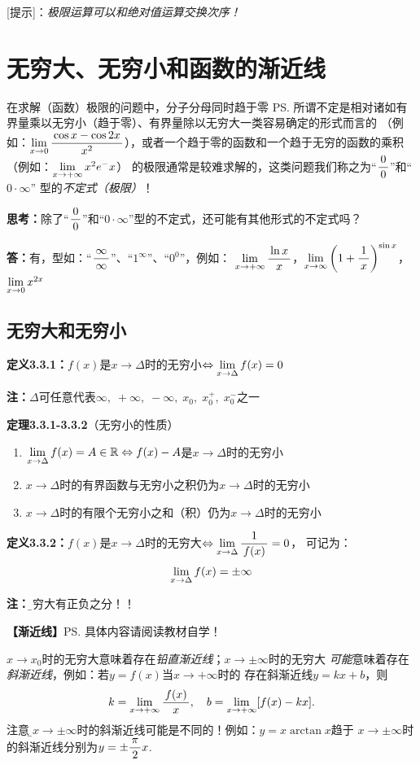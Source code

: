 [提示]：{\it 极限运算可以和绝对值运算交换次序！}

\section{无穷大、无穷小和函数的渐近线}

在求解（函数）极限的问题中，分子分母同时趋于零
\ps{所谓不定是相对诸如有界量乘以无穷小（趋于零）、有界量除以无穷大一类容易确定的形式而言的}
（例如：$\lim\limits_{x\to{0}}\displaystyle\frac{\,{\cos
x-\cos2x}\,}{\,{x^2}\,}$），或者一个趋于零的函数和一个趋于无穷的函数的乘积（例如：$\lim\limits_{x\to{+\infty}}x^2e^-x$）
的极限通常是较难求解的，这类问题我们称之为“$\displaystyle\frac{\,{0}\,}{\,{0}\,}$”和“$0\cdot\infty$” 型的{\it 不定式（极限）}！


{\bf 思考：}除了“$\displaystyle\frac{\,{0}\,}{\,{0}\,}$”和“$0\cdot\infty$”型的不定式，还可能有其他形式的不定式吗？

{\bf 答：}有，型如：“$\displaystyle\frac{\,{\infty}\,}{\,{\infty}\,}$”、“$1^{\infty}$”、“$0^0$”，例如：
$\lim\limits_{x\to{+\infty}}\displaystyle\frac{\,{\ln x}\,}{\,{x}\,}$，$\lim\limits_{x\to{\infty}}\left(1+\displaystyle\frac{\,{1}\,}{\,{x}\,}\right)^{\sin
x}$，$\lim\limits_{x\to{0}}x^{2x}$

\subsection{无穷大和无穷小}

{\bf 定义3.3.1：}$f(x)$是$x\to\Delta$时的无穷小$\Leftrightarrow\lim\limits_{x\to{\Delta}}f(x)=0$

{\bf 注：}$\Delta$可任意代表$\infty,\;+\infty,\;-\infty,\;x_0,\;x_0^+,\;x_0^-$之一

{\bf 定理3.3.1-3.3.2}（无穷小的性质）
\begin{enumerate}[(1)]
  \setlength{\itemindent}{1cm}
  \item $\lim\limits_{x\to{\Delta}}f(x)=A\in\mathbb{R}\Leftrightarrow
  f(x)-A$是$x\to\Delta$时的无穷小
  \item $x\to\Delta$时的有界函数与无穷小之积仍为$x\to\Delta$时的无穷小
  \item $x\to\Delta$时的有限个无穷小之和（积）仍为$x\to\Delta$时的无穷小
\end{enumerate}

{\bf 定义3.3.2：}$f(x)$是$x\to\Delta$时的无穷大$\Leftrightarrow\lim\limits_{x\to{\Delta}}\displaystyle\frac{\,{1}\,}{\,{f(x)}\,}=0$，
可记为：
$$\lim\limits_{x\to{\Delta}}f(x)=\pm\infty$$

{\bf 注：}{\b 无穷大有正负之分！！}

{\bf 【渐近线】}\ps{具体内容请阅读教材自学！}

$x\to x_0$时的无穷大意味着存在{\it 铅直渐近线}；$x\to\pm\infty$时的无穷大
{\it 可能}意味着存在{\it 斜渐近线}，例如：若$y=f(x)$当$x\to+\infty$时的
存在斜渐近线$y=kx+b$，则
$$k=\lim\limits_{x\to{+\infty}}\displaystyle\frac{\,{f(x)}\,}{\,{x}\,},\quad b=\lim\limits_{x\to{+\infty}}[f(x)-kx].$$
注意，{\b $x\to\pm\infty$时的斜渐近线可能是不同的！}例如：$y=x\arctan x$趋于
$x\to\pm\infty$时的斜渐近线分别为$y=\pm\displaystyle\frac{\,{\pi}\,}{\,{2}\,}x$.

